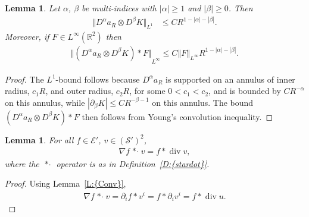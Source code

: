 \documentclass[reqno,openright,11pt,twoside]{amsart}
\newtheorem{lemma}[theorem]{Lemma}
\theoremstyle{definition}
\numberwithin{equation}{section}
\begin{document}
\begin{lemma}\label{L:OrderaRK}
	Let ${\ensuremath{\alpha}}$, $\beta$ be multi-indices with ${\left\vert{\ensuremath{\alpha}}\right\vert} \ge 1$ and ${\left\vert{\beta}\right\vert} \ge 0$. Then
	\begin{align*}
		{\ensuremath{\Vert {D^{\ensuremath{\alpha}} a_R \otimes D^\beta K} \Vert}}_{L^1}
			&\le C R^{1 - {\left\vert{\ensuremath{\alpha}}\right\vert} - {\left\vert{\beta}\right\vert}}.
	\end{align*}
	Moreover, if $F \in L^{\ensuremath{\infty}}({\ensuremath{{\ensuremath{\mathbb{{R}}}}}}^2)$ then
	\begin{align*}
		{\ensuremath{\Vert {(D^{\ensuremath{\alpha}} a_R \otimes D^\beta K) * F} \Vert}}_{L^{\ensuremath{\infty}}}
			\le C {\ensuremath{\left\Vert {F} \right\Vert}}_{L^{\ensuremath{\infty}}} R^{1 - {\left\vert{\ensuremath{\alpha}}\right\vert} - {\left\vert{\beta}\right\vert}}.
	\end{align*}
\end{lemma}
\begin{proof}
	The $L^1$-bound follows because $D^{\ensuremath{\alpha}} a_R$ is supported on an annulus of inner radius,
	$c_1 R$, and outer radius, $c_2 R$, for some $0 < c_1 < c_2$,
	and is bounded by $C R^{-{\ensuremath{\alpha}}}$ on this annulus, while ${\left\vert{{\ensuremath{\partial}}_\beta K}\right\vert} \le C R^{-\beta - 1}$
	on this annulus. The bound $(D^{\ensuremath{\alpha}} a_R \otimes D^\beta K) * F$ then follows from
	Young's convolution inequality.
\end{proof}

\begin{lemma}\label{L:stardot}
	For all $f \in {\ensuremath{\mathcal{{E}}}}'$, $v \in ({\ensuremath{\mathcal{{S}}}}')^2$,
	\begin{align*}
		{\ensuremath{\nabla}} f {\mathop{* \cdot}} v
			= f * \operatorname{div} v,
	\end{align*}
	where the ${\mathop{* \cdot}}$ operator is as in {Definition~\ref{D:{stardot}}}.
\end{lemma}
\begin{proof}
    Using {Lemma~\ref{L:{Conv}}},
    \begin{align*}
        {\ensuremath{\nabla}} f {\mathop{* \cdot}} v
            = {\ensuremath{\partial}}_i f *v^i
            = f * {\ensuremath{\partial}}_i v^i
            = f * \operatorname{div} u.
    \end{align*}
\end{proof}
\end{document}
